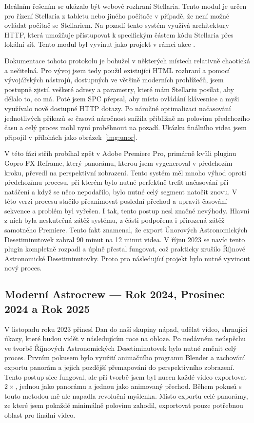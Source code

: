 \documentclass[12pt,a4paper,titlepage]{article}
\begin{document}
Ideálním řešením se ukázalo být webové rozhraní Stellaria. Tento modul je určen pro řízení Stellaria z tabletu nebo jiného počítače v případě, že není možné ovládat počítač se Stellariem. Na pozadí tento systém využívá architektury HTTP, která umožňuje přistupovat k specifickým částem kódu Stellaria přes lokální síť. Tento modul byl vyvinut jako projekt v rámci akce . 

Dokumentace tohoto protokolu je bohužel v některých místech relativně chaotická a nečitelná. Pro vývoj jsem tedy použil existující HTML rozhraní a pomocí vývojářských nástrojů, dostupných ve většině moderních prohlížečů, jsem postupně zjistil veškeré adresy a parametry, které mám Stellariu posílat, aby dělalo to, co má. Poté jsem SPC přepsal, aby místo ovládání klávesnice a myši využívalo nově dostupné HTTP dotazy. Po náročné optimalizaci načasování jednotlivých příkazů se časová náročnost snížila přibližně na polovinu předchozího času a celý proces mohl nyní proběhnout na pozadí. Ukázku finálního videa jsem připojil v přílohách jako obrázek~\ref{img:unor}.

V této fázi střih probíhal zpět v Adobe Premiere Pro, primárně kvůli pluginu Gopro FX Reframe, který panorámu, kterou jsem vygeneroval v předchozím kroku, převedl na perspektivní zobrazení. Tento systém měl mnoho výhod oproti předchozímu procesu, při kterém bylo nutné perfektně trefit načasování při natáčení a když se něco nepodařilo, bylo nutné celý segment natočit znovu. V této verzi procesu stačilo přeanimovat poslední přechod a upravit časování sekvence a problém byl vyřešen. I tak, tento postup nesl značné nevýhody. Hlavní z nich byla neskutečná zátěž systému, z části podpořena i přirozená zátěž samotného Premiere. Tento fakt znamenal, že export Únorových Astronomických Desetiminutovek zabral 90 minut na 12 minut videa. V říjnu 2023 se navíc tento plugin kompletně rozpadl a úplně přestal fungovat, což prakticky zrušilo Říjnové Astronomické Desetiminutovky. Proto pro následující projekt bylo nutné vyvinout nový proces. 
\subsection{Moderní Astrocrew --- Rok 2024, Prosinec 2024 a Rok 2025}
V listopadu roku 2023 přinesl Dan do naší skupiny nápad, udělat video, shrnující úkazy, které budou vidět v následujícím roce na obloze. Po nedávném neúspěchu ve tvorbě Říjnových Astronomických Desetiminutovek bylo nutné změnit celý proces. Prvním pokusem bylo využití animačního programu Blender a zachování exportu panorám a jejich pozdější přemapování do perspektivního zobrazení. Tento postup sice fungoval, ale při tvorbě jsem byl nucen každé video exportovat \(2\times \), jednou jako panorámu a jednou jako animovaný přechod. Během pokusů s touto metodou mě ale napadla revoluční myšlenka. Místo exportu celé panorámy, ze které jsem pokaždé minimálně polovinu zahodil, exportovat pouze potřebnou oblast pro finální video. 
\end{document}
